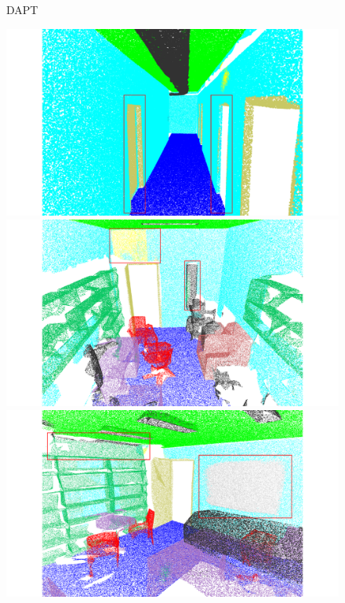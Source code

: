 \begin{figure}[htbp]
    \begin{minipage}{0.1\textwidth}
        \centering
        DAPT
    \end{minipage}
    \hfill
    \begin{minipage}{0.22\textwidth}
        \centering
        \includegraphics[width=\textwidth]{fig/supplement/semantic_segmentation/hallway_10/DAPT_hallway_10.pdf}
    \end{minipage}
    \hfill
    \begin{minipage}{0.22\textwidth}
        \centering
        \includegraphics[width=\textwidth]{fig/supplement/semantic_segmentation/office_9/DAPT_office_9.pdf}
    \end{minipage}
    \hfill
    \begin{minipage}{0.22\textwidth}
        \centering
        \includegraphics[width=\textwidth]{fig/supplement/semantic_segmentation/office_35/DAPT_office_35.pdf}

\end{minipage}
\end{figure}
